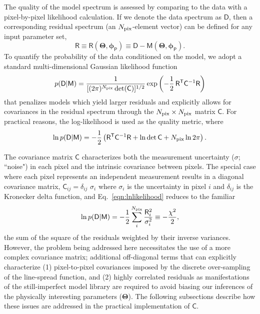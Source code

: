 \documentclass[iop,floatfix,twocolappendix]{emulateapj}
\newcommand{\vM}{\mathsf{M}}
\newcommand{\vD}{\mathsf{D}}
\newcommand{\vR}{\mathsf{R}}
\newcommand{\vC}{\mathsf{C}}
\newcommand{\trans}{\mathsf{T}}
\newcommand{\vT}{ {\bm \Theta}}
\newcommand{\vp}{ {\bm \phi}}
\newcommand{\cheb}{ \vp_{\mathsf{P}}}
\begin{document}
The quality of the model spectrum is assessed by comparing to the data with a pixel-by-pixel 
likelihood calculation.  If we denote the data spectrum as $\vD$, then a corresponding residual 
spectrum (an $N_{\rm pix}$-element vector) can be defined for any input parameter set,
\begin{equation}
\vR \equiv \vR(\vT, \cheb) \equiv \vD-\vM(\vT, \cheb).
\end{equation}
To quantify the probability of the data conditioned on the model, we adopt a standard 
multi-dimensional Gaussian likelihood function
\begin{equation}
p(\vD|\vM) =  \frac{1}{[(2 \pi)^{N_{\rm pix}} \det(\vC)]^{1/2}} \exp\left ( -\frac{1}{2} \,
   \vR^\trans \vC^{-1} \vR \right )
   \label{eqn:likelihood}
\end{equation}
that penalizes models which yield larger residuals and explicitly allows for covariances in the 
residual spectrum through the $N_{\rm pix} \times N_{\rm pix}$ matrix $\vC$.  For practical 
reasons, the log-likelihood is used as the quality metric, where
\begin{equation}
  \ln{p(\vD | \vM)} = -\frac{1}{2} \left( \vR^\trans \vC^{-1} \vR + \ln{\det{\vC}} + N_{\rm pix} \ln{2\pi} \right).
  \label{eqn:lnlikelihood}
\end{equation}

The covariance matrix $\vC$ characterizes both the measurement uncertainty ($\sigma$; ``noise") in 
each pixel and the intrinsic covariance between pixels.  The special case where each pixel 
represents an independent measurement results in a diagonal covariance matrix, $\vC_{ij} = 
\delta_{ij} \,\, \sigma_i$ where $\sigma_i$ is the uncertainty in pixel $i$ and $\delta_{ij}$ is 
the Kronecker delta function, and Eq.~\ref{eqn:lnlikelihood} reduces to the familiar
\begin{equation}
\ln{p(\vD | \vM)} = -\frac{1}{2} \sum_i^{N_{\rm pix}} \frac{\vR_i^2}{\sigma_i^2} \equiv -\frac{\chi^2}{2},
\label{eqn:chisq}
\end{equation}
the sum of the square of the residuals weighted by their inverse variances.  However, the problem 
being addressed here necessitates the use of a more complex covariance matrix; additional 
off-diagonal terms that can explicitly characterize (1) pixel-to-pixel covariances imposed by the 
discrete over-sampling of the line-spread function, and (2) highly correlated residuals as 
manifestations of the still-imperfect model library are required to avoid biasing our inferences of 
the physically interesting parameters ($\vT$).  The following subsections describe how these issues 
are addressed in the practical implementation of $\vC$.  
\end{document}
